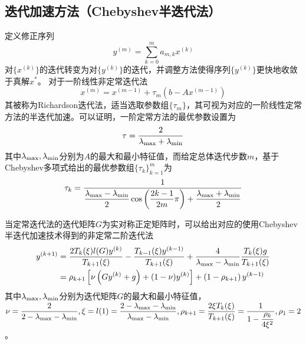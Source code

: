 \documentclass[UTF8,a4paper,10pt]{ctexart}
\begin{document}
        \subsection{迭代加速方法（Chebyshev半迭代法）}
            \par
            定义修正序列
            $$
            y^{(m)}=\sum_{k=0}^{m}a_{m,k}x^{(k)}
            $$
            对$\{x^{(k)}\}$的迭代转变为对$\{y^{(k)}\}$的迭代，并调整方法使得序列$\{y^{(k)}\}$更快地收敛于真解$x^*$。
            对于一阶线性非定常迭代法
            $$
            x^{(m)}=x^{(m-1)}+\tau_m(b-Ax^{(m-1)})
            $$
            其被称为Richardson迭代法，适当选取参数组$\{\tau_m\}$，其可视为对应的一阶线性定常方法的半迭代加速。可以证明，一阶定常方法的最优参数设置为
            $$
            \tau=\dfrac{2}{\lambda_{\rm{max}}+\lambda_{\rm{min}}}
            $$
            其中$\lambda_{\rm{max}},\lambda_{\rm{min}}$分别为$A$的最大和最小特征值，而给定总体迭代步数$m$，基于Chebyshev多项式给出的最优参数组$\{\tau_k\}_{k=1}^m$为
            $$
            \tau_k=\dfrac{1}{\dfrac{\lambda_{\rm{max}}-\lambda_{\rm{min}}}{2}\cos\left(\dfrac{2k-1}{2m}\pi\right)+\dfrac{\lambda_{\rm{max}}+\lambda_{\rm{min}}}{2}}
            $$
            \par
            当定常迭代法的迭代矩阵$G$为实对称正定矩阵时，可以给出对应的使用Chebyshev半迭代加速技术得到的非定常二阶迭代法
            \begin{align*}
                y^{(k+1)}&=\dfrac{2T_k(\xi)l(G)y^{(k)}}{T_{k+1}(\xi)}-\dfrac{T_{k-1}(\xi)y^{(k-1)}}{T_{k+1}(\xi)}+\dfrac{4}{\lambda_{\rm{max}}-\lambda_{\rm{min}}}\dfrac{T_k(\xi)g}{T_{k+1}(\xi)} \\
                &=\rho_{k+1}\left[\nu\left(Gy^{(k)}+g\right)+(1-\nu)y^{(k)}\right]+\left(1-\rho_{k+1}\right)y^{(k-1)}
            \end{align*}
            其中$\lambda_{\rm{max}},\lambda_{\rm{min}}$分别为迭代矩阵$G$的最大和最小特征值，$\nu=\dfrac{2}{2-\lambda_{\rm{max}}-\lambda_{\rm{min}}},\xi=l(1)=\dfrac{2-\lambda_{\rm{max}}-\lambda_{\rm{min}}}{\lambda_{\rm{max}}-\lambda_{\rm{min}}},\rho_{k+1}=\dfrac{2\xi T_k(\xi)}{T_{k+1}(\xi)}=\dfrac{1}{1-\dfrac{\rho_k}{4\xi^2}},\rho_1=2$。
\end{document}
